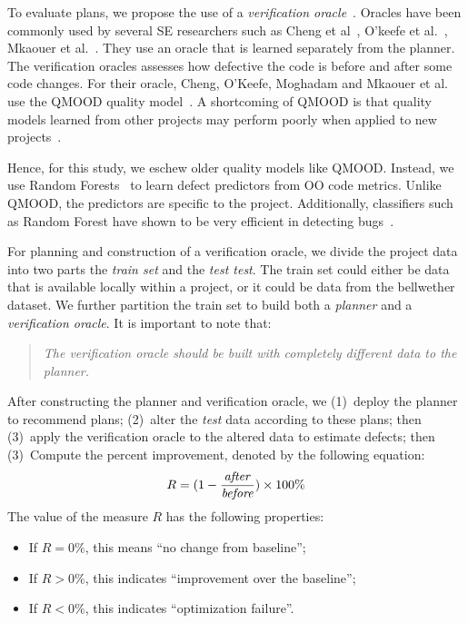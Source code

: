 \documentclass[conference]{IEEEtran}
\newcommand{\bi}{\begin{itemize}}%
\newcommand{\ei}{\end{itemize}}
\theoremstyle{break}
\begin{document}
To evaluate plans, we propose the use of a \textit{verification oracle}~\cite{krishna17a}. Oracles have been commonly used by several SE researchers such as Cheng et al~\cite{Cheng10}, O'keefe et al.~\cite{Okeeffe08}, Mkaouer et al.~\cite{Mkaouer14}. They use an oracle that is learned separately from the planner. The verification oracles assesses
how defective the code is before and after some
code changes.
For their oracle,
Cheng, O'Keefe, Moghadam and  Mkaouer et al. use the QMOOD
quality model~\cite{Bansiya02}.
A shortcoming of QMOOD
is that quality models learned from other projects
may perform poorly when applied to new projects~\cite{localvsglobal}.

Hence, for this study, we  eschew
older quality models like QMOOD. Instead, we use
Random Forests~\cite{Breiman2001} to learn defect predictors
from OO code metrics. 
Unlike QMOOD, the predictors
are specific to the project. Additionally, classifiers such as Random Forest have shown to be very efficient in detecting bugs~\cite{fu}.

For planning and construction of a verification oracle, we divide the
project data into two parts the \textit{train set} and the \textit{test test}.
The train set could either be data that is available locally within a project, or it could be data from the bellwether dataset. We further partition the train set to build both a {\em planner} and a {\em verification oracle}. It is important to note that: 
\begin{quote}
{\em The verification oracle should be built with completely different data to the planner.}
\end{quote}

After constructing the planner and verification oracle, we (1)~deploy the {planner} to recommend plans; (2)~alter the {\em test} data according to these plans;
then (3)~apply the {verification oracle} to the altered data to estimate defects; then (3)~Compute the percent improvement, denoted by the following equation:
\begin{equation}
\small
	\label{eq:diff}
	R=(1-\frac{\mathit{after}}{\mathit{before}})\times100\%
\end{equation}
The value of the measure $R$ has the following properties:
\bi
\item If $R = 0\%$, this means  ``no change from baseline''; 
\item If $R > 0\%$, this indicates ``improvement over the baseline'';
\item If $R < 0\%$, this indicates ``optimization failure''.
\ei
\end{document}
